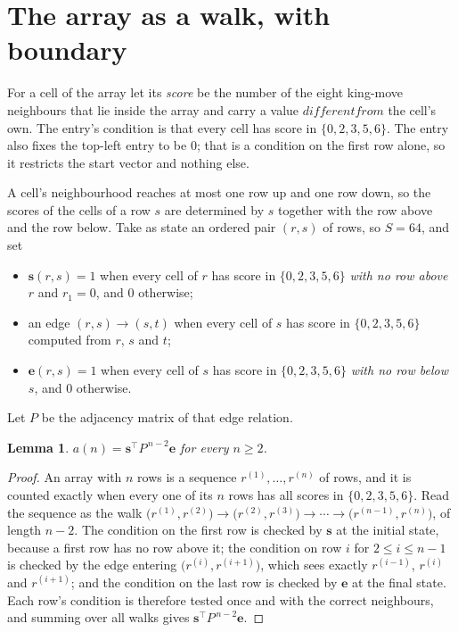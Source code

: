 \documentclass[11pt,a4paper]{article}
\theoremstyle{plain}
\newtheorem{lemma}[theorem]{Lemma}
\theoremstyle{definition}
\begin{document}
\section{The array as a walk, with boundary}

For a cell of the array let its \emph{score} be the number of the eight king-move neighbours that lie inside
the array and carry a value $different from$ the cell's own. The entry's condition is that every cell
has score in $\{0,2,3,5,6\}$. The entry also fixes the top-left entry to be $0$; that is a condition on the first row alone, so it restricts the start vector and nothing else.

A cell's neighbourhood reaches at most one row up and one row down, so the scores of the
cells of a row $s$ are determined by $s$ together with the row above and the row below.
Take as state an ordered pair $(r,s)$ of rows, so $S=64$, and set
\begin{itemize}
\item $\mathbf{s}(r,s)=1$ when every cell of $r$ has score in $\{0,2,3,5,6\}$ \emph{with no row
above $r$} and $r_1=0$, and $0$ otherwise;
\item an edge $(r,s)\to(s,t)$ when every cell of $s$ has score in $\{0,2,3,5,6\}$ computed from
$r$, $s$ and $t$;
\item $\mathbf{e}(r,s)=1$ when every cell of $s$ has score in $\{0,2,3,5,6\}$ \emph{with no row
below $s$}, and $0$ otherwise.
\end{itemize}
Let $P$ be the adjacency matrix of that edge relation.

\begin{lemma}\label{lem:walk}
$a(n)=\mathbf{s}^{\!\top}P^{\,n-2}\mathbf{e}$ for every $n\ge2$.
\end{lemma}

\begin{proof}
An array with $n$ rows is a sequence $r^{(1)},\dots,r^{(n)}$ of rows, and it is counted
exactly when every one of its $n$ rows has all scores in $\{0,2,3,5,6\}$. Read the sequence as the
walk $\bigl(r^{(1)},r^{(2)}\bigr)\to\bigl(r^{(2)},r^{(3)}\bigr)\to\cdots\to
\bigl(r^{(n-1)},r^{(n)}\bigr)$, of length $n-2$. The condition on the first row is
checked by $\mathbf{s}$ at the initial state, because a first row has no row above it; the
condition on row $i$ for $2\le i\le n-1$ is checked by the edge entering
$\bigl(r^{(i)},r^{(i+1)}\bigr)$, which sees exactly $r^{(i-1)}$, $r^{(i)}$ and
$r^{(i+1)}$; and the condition on the last row is checked by $\mathbf{e}$ at the final
state. Each row's condition is therefore tested once and with the correct neighbours, and
summing over all walks gives $\mathbf{s}^{\!\top}P^{\,n-2}\mathbf{e}$.
\end{proof}
\end{document}
